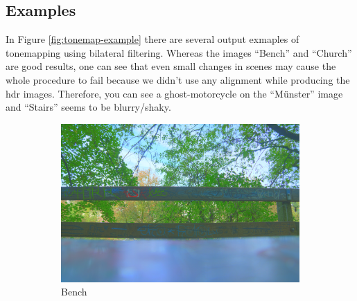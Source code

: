 \documentclass[a4spaper]{article}
\begin{document}
\subsection*{Examples}
In Figure \ref{fig:tonemap-example} there are several output exmaples of tonemapping using bilateral filtering. Whereas the images ``Bench''  and ``Church'' are good results, one can see that even small changes in scenes may cause the whole procedure to fail because we didn't use any alignment while producing the hdr images. Therefore, you can see a ghost-motorcycle on the ``M\"unster'' image and ``Stairs'' seems to be blurry/shaky.
\begin{figure}[ht]
	\centering
	\begin{subfigure}[h]{0.48\textwidth}
		\centering
		\includegraphics[width=\textwidth]{tonemap/bench_tonemapped_2_0-12_40}
		\caption*{Bench}
	\end{subfigure}
	~ 
	\begin{subfigure}[h]{0.48\textwidth}
		\centering

\end{subfigure}
\end{figure}
\end{document}
